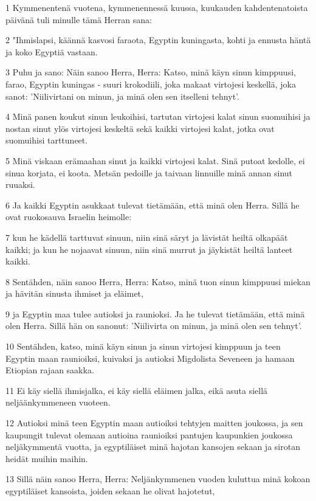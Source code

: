 \par 1 Kymmenentenä vuotena, kymmenennessä kuussa, kuukauden kahdentenatoista päivänä tuli minulle tämä Herran sana:
\par 2 "Ihmislapsi, käännä kasvosi faraota, Egyptin kuningasta, kohti ja ennusta häntä ja koko Egyptiä vastaan.
\par 3 Puhu ja sano: Näin sanoo Herra, Herra: Katso, minä käyn sinun kimppuusi, farao, Egyptin kuningas - suuri krokodiili, joka makaat virtojesi keskellä, joka sanot: 'Niilivirtani on minun, ja minä olen sen itselleni tehnyt'.
\par 4 Minä panen koukut sinun leukoihisi, tartutan virtojesi kalat sinun suomuihisi ja nostan sinut ylös virtojesi keskeltä sekä kaikki virtojesi kalat, jotka ovat suomuihisi tarttuneet.
\par 5 Minä viskaan erämaahan sinut ja kaikki virtojesi kalat. Sinä putoat kedolle, ei sinua korjata, ei koota. Metsän pedoille ja taivaan linnuille minä annan sinut ruuaksi.
\par 6 Ja kaikki Egyptin asukkaat tulevat tietämään, että minä olen Herra. Sillä he ovat ruokosauva Israelin heimolle:
\par 7 kun he kädellä tarttuvat sinuun, niin sinä säryt ja lävistät heiltä olkapäät kaikki; ja kun he nojaavat sinuun, niin sinä murrut ja jäykistät heiltä lanteet kaikki.
\par 8 Sentähden, näin sanoo Herra, Herra: Katso, minä tuon sinun kimppuusi miekan ja hävitän sinusta ihmiset ja eläimet,
\par 9 ja Egyptin maa tulee autioksi ja raunioksi. Ja he tulevat tietämään, että minä olen Herra. Sillä hän on sanonut: 'Niilivirta on minun, ja minä olen sen tehnyt'.
\par 10 Sentähden, katso, minä käyn sinun ja sinun virtojesi kimppuun ja teen Egyptin maan raunioiksi, kuivaksi ja autioksi Migdolista Seveneen ja hamaan Etiopian rajaan saakka.
\par 11 Ei käy siellä ihmisjalka, ei käy siellä eläimen jalka, eikä asuta siellä neljäänkymmeneen vuoteen.
\par 12 Autioksi minä teen Egyptin maan autioiksi tehtyjen maitten joukossa, ja sen kaupungit tulevat olemaan autioina raunioiksi pantujen kaupunkien joukossa neljäkymmentä vuotta, ja egyptiläiset minä hajotan kansojen sekaan ja sirotan heidät muihin maihin.
\par 13 Sillä näin sanoo Herra, Herra: Neljänkymmenen vuoden kuluttua minä kokoan egyptiläiset kansoista, joiden sekaan he olivat hajotetut,
